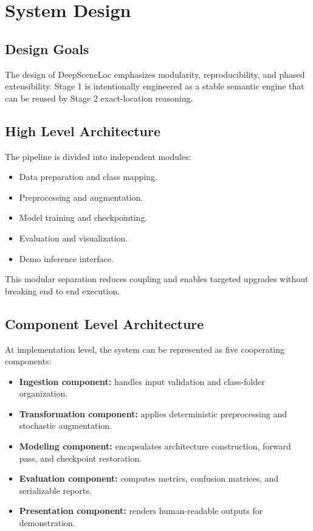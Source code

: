 \chapter{System Design}

\section{Design Goals}
The design of DeepSceneLoc emphasizes modularity, reproducibility, and phased extensibility. Stage 1 is intentionally engineered as a stable semantic engine that can be reused by Stage 2 exact-location reasoning.

\section{High Level Architecture}
The pipeline is divided into independent modules:
\begin{itemize}
\item Data preparation and class mapping.
\item Preprocessing and augmentation.
\item Model training and checkpointing.
\item Evaluation and visualization.
\item Demo inference interface.
\end{itemize}

This modular separation reduces coupling and enables targeted upgrades without breaking end to end execution.

\section{Component Level Architecture}
At implementation level, the system can be represented as five cooperating components:
\begin{itemize}
\item \textbf{Ingestion component:} handles input validation and class-folder organization.
\item \textbf{Transformation component:} applies deterministic preprocessing and stochastic augmentation.
\item \textbf{Modeling component:} encapsulates architecture construction, forward pass, and checkpoint restoration.
\item \textbf{Evaluation component:} computes metrics, confusion matrices, and serializable reports.
\item \textbf{Presentation component:} renders human-readable outputs for demonstration.
\end{itemize}

